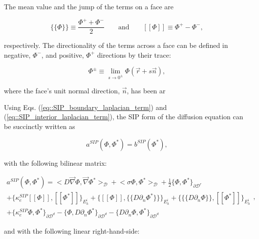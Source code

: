 The mean value and the jump of the terms on a face are

\begin{equation}
\label{eq::solution_mean_and_jump}
\{\!\{  \Phi \}\!\} \equiv \frac{\Phi^+ + \Phi^-}{2} \qquad \text{and} \qquad [\![   \Phi ]\!] \equiv \Phi^+ - \Phi^- ,
\end{equation}

\noindent respectively. The directionality of the terms across a face can be defined in negative, $\Phi^-$, and positive, $\Phi^+$ directions by their trace:

\begin{equation}
\label{eq::solution_trace}
\Phi^{\pm} \equiv \lim_{s \rightarrow 0^{\pm}} \Phi (\vec{r} + s \vec{n}),
\end{equation}

\noindent where the face's unit normal direction, $\vec{n}$, has been ar

Using Eqs. (\ref{eq::SIP_boundary_laplacian_term}) and (\ref{eq::SIP_interior_laplacian_term}), the SIP form of the diffusion equation can be succinctly written as

\begin{equation}
a^{SIP}( \Phi, \Phi^*) = b^{SIP}(\Phi^*),
\label{eq::SIP_weak_form}
\end{equation}

\noindent with the following bilinear matrix:

\begin{equation}
\label{eq::SIP_bilinear_form}
\begin{aligned}
a^{SIP}( \Phi, \Phi^*)  = \Big<  D \vec{\nabla}  \Phi , \vec{\nabla} \Phi^*  \Big>_{\mathcal{D}} + \Big<  \sigma   \Phi ,  \Phi^*  \Big>_{\mathcal{D}}  +  \frac{1}{2} \Big\{    \Phi , \Phi^* \Big\}_{\partial \mathcal{D}^r}   \\
+  \Big\{ \kappa_e^{SIP} [\![   \Phi ]\!] , [\![  \Phi^* ]\!]\Big\}_{E_h^i} + \Big\{  [\![   \Phi ]\!] , \{\!\{  D \partial_n \Phi^* \}\!\}\Big\}_{E_h^i}  + \Big\{ \{\!\{  D \partial_n  \Phi \}\!\} , [\![ \Phi^* ]\!]\Big\}_{E_h^i} \\
+ \Big\{ \kappa_e^{SIP}   \Phi ,   \Phi^* \Big\}_{\partial \mathcal{D}^d} - \Big\{   \Phi  ,  D \partial_n \Phi^* \Big\}_{\partial \mathcal{D}^d} - \Big\{   D 				\partial_n  \Phi , \Phi^* \Big\}_{\partial \mathcal{D}^d}  
\end{aligned} ,
\end{equation}

\noindent and with the following linear right-hand-side:

